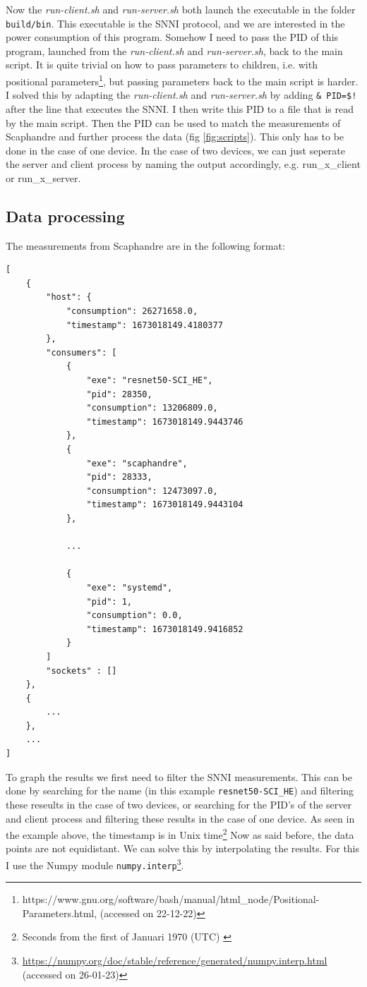 \documentclass[../thesis.tex]{subfiles}
\begin{document}
Now the \textit{run-client.sh} and \textit{run-server.sh} both launch the executable in the folder \verb|build/bin|. This executable is the SNNI protocol, and we are interested in the power consumption of this program. Somehow I need to pass the PID of this program, launched from the \textit{run-client.sh} and \textit{run-server.sh}, back to the main script. It is quite trivial on how to pass parameters to children, i.e. with positional parameters\footnote{https://www.gnu.org/software/bash/manual/html_node/Positional-Parameters.html, (accessed on 22-12-22)}, but passing parameters back to the main script is harder. I solved this by adapting the \textit{run-client.sh} and \textit{run-server.sh} by adding \verb|& PID=$!| after the line that executes the SNNI. I then write this PID to a file that is read by the main script. Then the PID can be used to match the measurements of Scaphandre and further process the data (fig \ref{fig:scripts}). This only has to be done in the case of one device. In the case of two devices, we can just seperate the server and client process by naming the output accordingly, e.g. run\_x\_client or run\_x\_server. 

\subsection{Data processing}
The measurements from Scaphandre are in the following format:

\begin{lstlisting}
[
    {
        "host": {
            "consumption": 26271658.0,
            "timestamp": 1673018149.4180377
        },
        "consumers": [
            {
                "exe": "resnet50-SCI_HE",
                "pid": 28350,
                "consumption": 13206809.0,
                "timestamp": 1673018149.9443746
            },
            {
                "exe": "scaphandre",
                "pid": 28333,
                "consumption": 12473097.0,
                "timestamp": 1673018149.9443104
            },

            ...

            {
                "exe": "systemd",
                "pid": 1,
                "consumption": 0.0,
                "timestamp": 1673018149.9416852
            }
        ]
        "sockets" : []
    },
    {
        ...
    },
    ...
]
\end{lstlisting}

To graph the results we first need to filter the SNNI measurements. This can be done by searching for the name (in this example \verb|resnet50-SCI_HE|) and filtering these reseults in the case of two devices, or searching for the PID's of the server and client process and filtering these results in the case of one device. As seen in the example above, the timestamp is in Unix time\footnote{Seconds from the first of Januari 1970 (UTC) \url{}} Now as said before, the data points are not equidistant. We can solve this by interpolating the results. For this I use the Numpy module \verb|numpy.interp|\footnote{\url{https://numpy.org/doc/stable/reference/generated/numpy.interp.html} (accessed on 26-01-23)}. 
\end{document}
